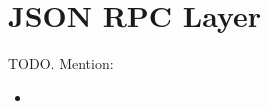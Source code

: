 \section{JSON RPC Layer} %
\label{sec:json_rpc_layer}
TODO. Mention:
\begin{itemize}
	\item 
\end{itemize}
